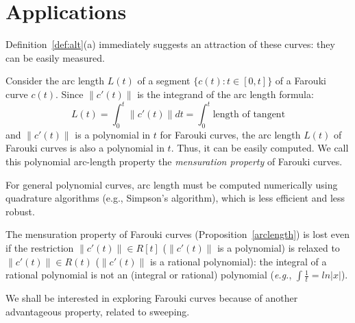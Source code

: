 \section{Applications}

Definition~\ref{def:alt}(a) immediately suggests an attraction of these curves:
they can be easily measured.

\begin{propn}
\label{arclength}
Consider the arc length $L(t)$ of a segment $\{c(t):t\in [0,t]\}$ of a Farouki 
curve $c(t)$.
Since $\| c'(t) \|$ is the integrand of the arc length formula:
\[ \label{eq1}
L(t) = \int_0^t \| c'(t) \| dt  = \int_0^t \mbox{length of tangent} 
\]
and $\| c'(t) \|$ is a polynomial in $t$ for Farouki curves,
the arc length $L(t)$ of Farouki curves is also a polynomial in $t$.
Thus, it can be easily computed.
We call this polynomial arc-length property 
the {\em mensuration property} of Farouki curves.
\end{propn}

For general polynomial curves, arc length must be 
computed numerically using quadrature algorithms (e.g., Simpson's
algorithm), which is less efficient and less robust.


\begin{rmk}
\label{mens-destroy}
The mensuration property of Farouki curves (Proposition~\ref{arclength})
is lost even if the restriction $\| c'(t) \| \in R[t]$ 
($\| c'(t) \|$ is a polynomial) is relaxed to 
$\| c'(t) \| \in R(t)$ ($\| c'(t) \|$ is a rational
polynomial):
the integral of a rational polynomial
is not an (integral or rational) polynomial 
({\em e.g.}, $\int \frac{1}{t} = ln |x|$).
\end{rmk}

We shall be interested in exploring Farouki curves
because of another advantageous property, related to sweeping.

